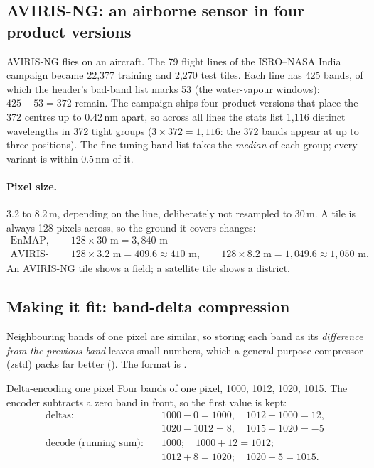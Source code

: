 \subsection{AVIRIS-NG: an airborne sensor in four product versions}

AVIRIS-NG flies on an aircraft. The 79 flight lines of the ISRO--NASA India campaign became 22,377 training and 2,270 test
tiles.\tbrk{} Each line has 425 bands, of which the header's bad-band list marks 53 (the water-vapour
windows): $425 - 53 = 372$ remain. The campaign ships four product versions that place the 372 centres up to 0.42\,nm apart, so
across all lines the stats list 1,116 distinct wavelengths in 372 tight groups ($3 \times 372 = 1{,}116$: the 372 bands appear at
up to three positions). The fine-tuning band list  takes the \emph{median} of each group; every variant is
within 0.5\,nm of it.

\paragraph{Pixel size.} 3.2 to 8.2\,m, depending on the line, deliberately not resampled to 30\,m. A tile is always 128 pixels
across, so the ground it covers changes:
\begin{align*}
  \text{EnMAP, PRISMA:}&\quad 128 \times 30 \text{ m} = 3{,}840 \text{ m}\\
  \text{AVIRIS-NG:}&\quad 128 \times 3.2 \text{ m} = 409.6 \approx 410 \text{ m}, \qquad 128 \times 8.2 \text{ m} = 1{,}049.6 \approx 1{,}050 \text{ m.}
\end{align*}
An AVIRIS-NG tile shows a field; a satellite tile shows a district.

\subsection{Making it fit: band-delta compression}

Neighbouring bands of one pixel are similar, so storing each band as its \emph{difference from the previous band} leaves small
numbers, which a general-purpose compressor (zstd) packs far better (). The format is
.

\begin{worked}[label={we:pretrain:delta}]{Delta-encoding one pixel}
Four bands of one pixel, 1000, 1012, 1020, 1015. The encoder subtracts a zero band in front, so the first value is kept:
\begin{align*}
  \text{deltas:}\quad & 1000 - 0 = 1000,\quad 1012 - 1000 = 12,\\
                      & 1020 - 1012 = 8,\quad 1015 - 1020 = -5\\
  \text{decode (running sum):}\quad & 1000;\quad 1000 + 12 = 1012;\\
                      & 1012 + 8 = 1020;\quad 1020 - 5 = 1015.
\end{align*}
\end{worked}

